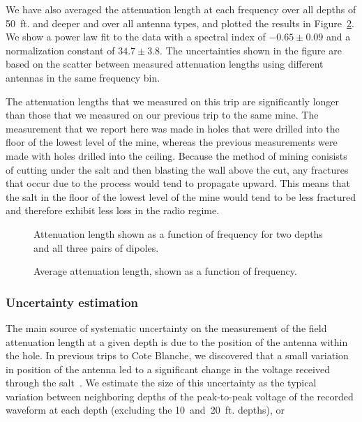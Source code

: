 \documentclass{elsart}
\begin{document}
  We have also averaged the attenuation length at each frequency over all depths 
  of 50~ft. and deeper and over all antenna types, 
  and plotted the results in Figure~\ref{fig:avg}.  We show a power law fit to the data with a spectral 
  index of $-0.65\pm0.09$ and a normalization constant of $34.7\pm3.8$.  
  The uncertainties shown in the figure are based on the 
  scatter between measured attenuation lengths using different antennas in the same frequency bin.
  
  The attenuation lengths that we measured on this trip are significantly longer than those 
  that we measured on our previous trip to the same mine.  The measurement that we report here 
  was made in holes that were drilled into the floor of the lowest level of the mine, whereas 
  the previous measurements were made with holes drilled into the ceiling.  Because the method  
  of mining conisists of cutting under the salt and then blasting the wall above the cut, any 
  fractures that occur due to the process would tend to propagate upward.  This means that the salt 
  in the floor of the lowest level of the mine would tend to be less fractured and therefore 
  exhibit less loss in the radio regime.  

  \begin{figure}
    \caption{Attenuation length shown as a function of frequency for two depths and all three pairs of dipoles.}
    \label{fig:freq}
  \end{figure}
  \begin{figure}
    \caption{Average attenuation length, shown as a function of frequency.}
    \label{fig:avg}
  \end{figure}
  
  \subsubsection{Uncertainty estimation}
  \label{sec:error}
  The main source of systematic uncertainty on the measurement of 
  the field attenuation length at a given depth 
  is due to the position of the antenna within the hole.  
  In previous trips to Cote Blanche, we discovered that a small variation in position of the antenna 
  led to a significant change in the voltage received through the salt~\cite{secondvisit}.  
  We estimate the size of this uncertainty as the typical variation between neighboring depths of 
  the peak-to-peak voltage of the recorded waveform at each depth
  (excluding the 10~and~20~ft. depths), or
  
\end{document}
